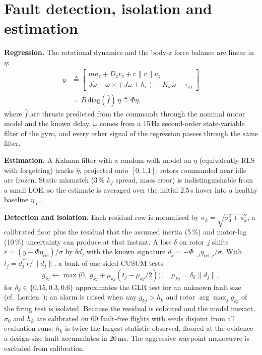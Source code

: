 \documentclass[conference]{IEEEtran}
\begin{document}
\section{Fault detection, isolation and estimation}\label{sec:fdi}
\textbf{Regression.} The rotational dynamics and the body-z force balance are linear in $\eta$:
\begin{equation}
\begin{aligned}
y &\triangleq \begin{bmatrix} m a_z + D_z v_z + c\|v\|v_z\\ J\dot\omega + \omega\times(J\omega+h_r)
+K_\omega\omega - \tau_{\dot\Omega}\end{bmatrix}\\
&= B\,\mathrm{diag}(\hat f)\,\eta \triangleq \Phi\eta,
\end{aligned}
\end{equation}
where $\hat f$ are thrusts predicted from the commands through the nominal motor model and the
known delay. $\dot\omega$ comes from a 15\,Hz second-order state-variable filter of the gyro, and
every other signal of the regression passes through the same filter.

\textbf{Estimation.} A Kalman filter with a random-walk model on $\eta$ (equivalently RLS with
forgetting) tracks $\hat\eta$, projected onto $[0,1.1]$; rotors commanded near idle are frozen.
Static mismatch (3\,\% $k_f$ spread, mass error) is indistinguishable from a small LOE, so the
estimate is averaged over the initial 2.5\,s hover into a healthy baseline $\eta_{\mathrm{ref}}$.

\textbf{Detection and isolation.} Each residual row is normalised by
$\sigma_k=\sqrt{\sigma_0^2+u_k^2}$, a calibrated floor plus the residual that the assumed inertia
(5\,\%) and motor-lag (10\,\%) uncertainty can produce at that instant. A loss $\delta$ on rotor
$j$ shifts $r=(y-\Phi\eta_{\mathrm{ref}})/\sigma$ by $\delta d_j$ with the known signature
$d_j=-\Phi_{:,j}\eta_{\mathrm{ref},j}/\sigma$. With $t_j=d_j^\top r/\|d_j\|$, a bank of one-sided
CUSUM tests~\cite{page1954continuous,basseville1993detection}
\begin{equation}
g_{kj}\leftarrow\max\!\big(0,\;g_{kj}+\mu_{kj}(t_j-\mu_{kj}/2)\big),\quad \mu_{kj}=\delta_k\|d_j\|,
\end{equation}
for $\delta_k\in\{0.15,0.3,0.6\}$ approximates the GLR test for an unknown fault size
(cf.\ Lorden~\cite{lorden1971procedures}); an alarm is raised when any $g_{kj}>h_k$ and rotor
$\arg\max_j g_{kj}$ of the firing test is isolated. Because the residual is coloured and the model
inexact, $\sigma_0$ and $h_k$ are calibrated on 60 fault-free flights with seeds disjoint from all
evaluation runs: $h_k$ is twice the largest statistic observed, floored at the evidence a
design-size fault accumulates in 20\,ms. The aggressive waypoint manoeuvre is excluded from
calibration.
\end{document}
